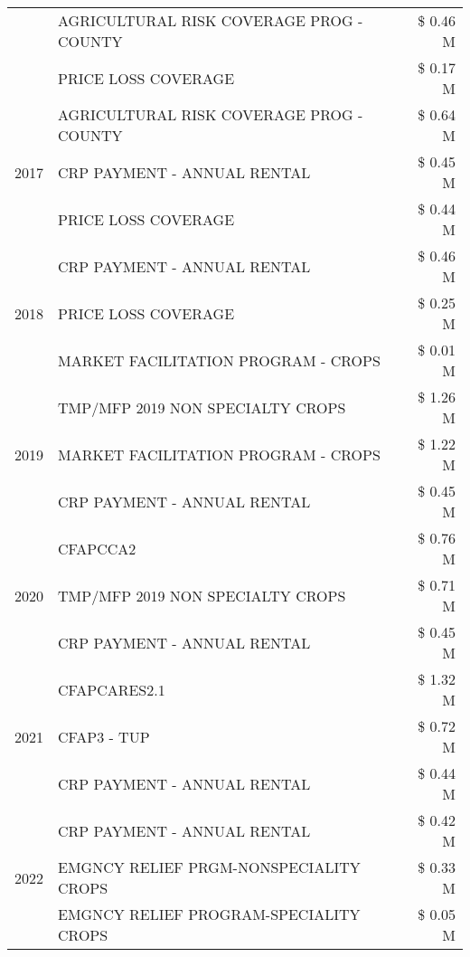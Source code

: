 \begin{tabular}{llr}
 & AGRICULTURAL RISK COVERAGE PROG - COUNTY & \$ 0.46 M \\
 & PRICE LOSS COVERAGE & \$ 0.17 M \\
\cline{1-3}
\multirow[t]{3}{*}{2017} & AGRICULTURAL RISK COVERAGE PROG - COUNTY & \$ 0.64 M \\
 & CRP PAYMENT - ANNUAL RENTAL & \$ 0.45 M \\
 & PRICE LOSS COVERAGE & \$ 0.44 M \\
\cline{1-3}
\multirow[t]{3}{*}{2018} & CRP PAYMENT - ANNUAL RENTAL & \$ 0.46 M \\
 & PRICE LOSS COVERAGE & \$ 0.25 M \\
 & MARKET FACILITATION PROGRAM - CROPS & \$ 0.01 M \\
\cline{1-3}
\multirow[t]{3}{*}{2019} & TMP/MFP 2019 NON SPECIALTY CROPS & \$ 1.26 M \\
 & MARKET FACILITATION PROGRAM - CROPS & \$ 1.22 M \\
 & CRP PAYMENT - ANNUAL RENTAL & \$ 0.45 M \\
\cline{1-3}
\multirow[t]{3}{*}{2020} & CFAPCCA2 & \$ 0.76 M \\
 & TMP/MFP 2019 NON SPECIALTY CROPS & \$ 0.71 M \\
 & CRP PAYMENT - ANNUAL RENTAL & \$ 0.45 M \\
\cline{1-3}
\multirow[t]{3}{*}{2021} & CFAPCARES2.1 & \$ 1.32 M \\
 & CFAP3 - TUP & \$ 0.72 M \\
 & CRP PAYMENT - ANNUAL RENTAL & \$ 0.44 M \\
\cline{1-3}
\multirow[t]{3}{*}{2022} & CRP PAYMENT - ANNUAL RENTAL & \$ 0.42 M \\
 & EMGNCY RELIEF PRGM-NONSPECIALITY CROPS & \$ 0.33 M \\
 & EMGNCY RELIEF PROGRAM-SPECIALITY CROPS & \$ 0.05 M \\
\cline{1-3}
\bottomrule
\end{tabular}
